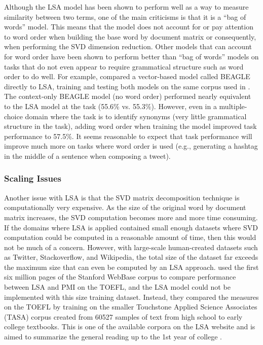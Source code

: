 \documentclass[man,floatsintext,donotrepeattitle]{apa6}
\begin{document}
Although the LSA model has been shown to perform well as a way to measure similarity between two terms, one of the main criticisms is that it is a ``bag of words'' model.
This means that the model does not account for or pay attention to word order when building the base word by document matrix or consequently, when performing the SVD dimension reduction.
Other models that can account for word order have been shown to perform better than ``bag of words'' models on tasks that do not even appear to require grammatical structure such as word order to do well.
For example, \textcite{Jones2007} compared a vector-based model called BEAGLE directly to LSA, training and testing both models on the same corpus used in \textcite{Landauer1997}.
The context-only BEAGLE model (no word order) performed nearly equivalent to the LSA model at the task (55.6\% vs. 55.3\%).
However, even in a multiple-choice domain where the task is to identify synonyms (very little grammatical structure in the task), adding word order when training the model improved task performance to 57.5\%.
It seems reasonable to expect that task performance will improve much more on tasks where word order is used (e.g., generating a hashtag in the middle of a sentence when composing a tweet).

\subsubsection{Scaling Issues}

Another issue with LSA is that the SVD matrix decomposition technique is computationally very expensive.
As the size of the original word by document matrix increases, the SVD computation becomes more and more time consuming.
If the domains where LSA is applied contained small enough datasets where SVD computation could be computed in a reasonable amount of time, then this would not be much of a concern.
However, with large-scale human-created datasets such as Twitter, Stackoverflow, and Wikipedia, the total size of the dataset far exceeds the maximum size that can even be computed by an LSA approach.
\textcite{Budiu2007} used the first six million pages of the Stanford WebBase corpus to compare performance between LSA and PMI on the TOEFL, and the LSA model could not be implemented with this size training dataset.
Instead, they compared the measures on the TOEFL by training on the smaller Touchstone Applied Science Associates (TASA) corpus created from \num{60527} samples of text from high school to early college textbooks.
This is one of the available corpora on the LSA website and is aimed to summarize the general reading up to the 1st year of college \parencite{Budiu2007}.
\end{document}
